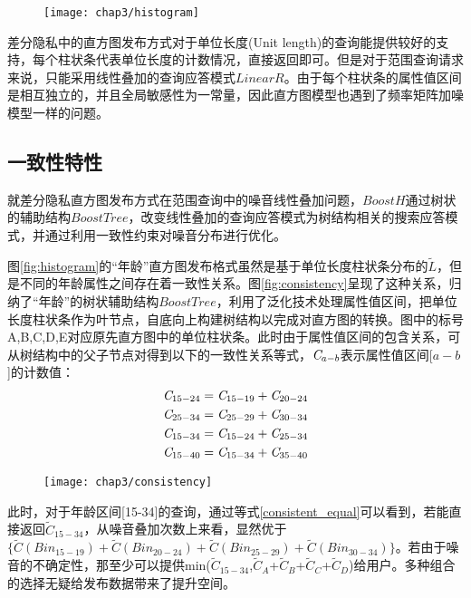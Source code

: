\begin{figure}[!htp]
	\centering
	\texttt{[image: chap3/histogram]}
\end{figure}

差分隐私中的直方图发布方式对于单位长度(Unit length)的查询能提供较好的支持，每个柱状条代表单位长度的计数情况，直接返回即可。但是对于范围查询请求来说，只能采用线性叠加的查询应答模式$LinearR$。由于每个柱状条的属性值区间是相互独立的，并且全局敏感性为一常量，因此直方图模型也遇到了频率矩阵加噪模型一样的问题。

\subsection{一致性特性}

就差分隐私直方图发布方式在范围查询中的噪音线性叠加问题，$BoostH$通过树状的辅助结构$BoostTree$，改变线性叠加的查询应答模式为树结构相关的搜索应答模式，并通过利用一致性约束对噪音分布进行优化。

图\ref{fig:histogram}的“年龄”直方图发布格式虽然是基于单位长度柱状条分布的$\tilde{L}$，但是不同的年龄属性之间存在着一致性关系。图\ref{fig:consistency}呈现了这种关系，归纳了“年龄”的树状辅助结构$BoostTree$，利用了泛化技术处理属性值区间，把单位长度柱状条作为叶节点，自底向上构建树结构以完成对直方图的转换。图中的标号A,B,C,D,E对应原先直方图中的单位柱状条。此时由于属性值区间的包含关系，可从树结构中的父子节点对得到以下的一致性关系等式，${\it{C}}_{a-b}$表示属性值区间[$a-b$]的计数值：
\begin{equation}
\label{consistent_equal}
\begin{split}
&{\it{C}}_{15-24} = {\it{C}}_{15-19}+{\it{C}}_{20-24}\\
&{\it{C}}_{25-34} = {\it{C}}_{25-29}+{\it{C}}_{30-34}\\
&{\it{C}}_{15-34} = {\it{C}}_{15-24}+{\it{C}}_{25-34}\\
&{\it{C}}_{15-40} = {\it{C}}_{15-34}+{\it{C}}_{35-40}
\end{split}
\end{equation}

\begin{figure}[!htp]
	\centering
	\texttt{[image: chap3/consistency]}
\end{figure}

此时，对于年龄区间[15-34]的查询，通过等式\ref{consistent_equal}可以看到，若能直接返回{$\widetilde{C}_{15-34}$}，从噪音叠加次数上来看，显然优于$\{\tilde{C}(Bin_{15-19})+\tilde{C}(Bin_{20-24})+\tilde{C}(Bin_{25-29})+\tilde{C}(Bin_{30-34})\}$。若由于噪音的不确定性，那至少可以提供min({$\tilde{C}_{15-34}$},{$\tilde{C}_{A}$}+{$\tilde{C}_{B}$}+{$\tilde{C}_{C}$}+{$\tilde{C}_{D}$})给用户。多种组合的选择无疑给发布数据带来了提升空间。

